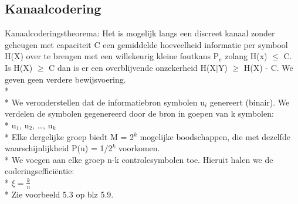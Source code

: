 \documentclass[10pt]{article}
\begin{document}
\subsection{Kanaalcodering}
Kanaalcoderingstheorema: Het is mogelijk langs een discreet kanaal zonder geheugen met capaciteit C een gemiddelde hoeveelheid informatie per symbool H(X) over te brengen met een willekeurig kleine foutkans P$_e$ zolang H(x) $\leq$ C. Is H(X) $\geq$ C dan is er een overblijvende onzekerheid H(X$|$Y) $\geq$ H(X) - C.
We geven geen verdere bewijsvoering.\\*\\*
We veronderstellen dat de informatiebron symbolen u$_i$ genereert (binair). We verdelen de symbolen gegenereerd door de bron in goepen van k symbolen:\\*
u$_1$, u$_2$, \dots, u$_k$\\*
Elke dergelijke groep biedt M = 2$^k$ mogelijke boodschappen, die met dezelfde waarschijnlijkheid P(u) = 1/2$^k$ voorkomen.\\*
We voegen aan elke groep n-k controlesymbolen toe. Hieruit halen we de coderingseffici\"entie:\\*
$\xi = \frac{k}{n}$\\*
{\scriptsize Zie voorbeeld 5.3 op blz 5.9.}
\end{document}
